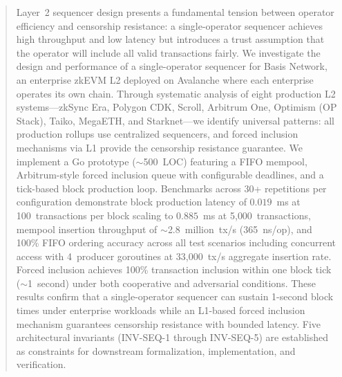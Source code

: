 
\begin{abstract}
Layer~2 sequencer design presents a fundamental tension between operator efficiency and
censorship resistance: a single-operator sequencer achieves high throughput and low latency
but introduces a trust assumption that the operator will include all valid transactions
fairly. We investigate the design and performance of a single-operator sequencer for Basis
Network, an enterprise zkEVM L2 deployed on Avalanche where each enterprise operates its
own chain. Through systematic analysis of eight production L2 systems---zkSync Era,
Polygon CDK, Scroll, Arbitrum One, Optimism (OP Stack), Taiko, MegaETH, and
Starknet---we identify universal patterns: all production rollups use centralized sequencers,
and forced inclusion mechanisms via L1 provide the censorship resistance guarantee.
We implement a Go prototype (${\sim}$500~LOC) featuring a FIFO mempool, Arbitrum-style
forced inclusion queue with configurable deadlines, and a tick-based block production
loop. Benchmarks across 30+ repetitions per configuration demonstrate block production
latency of $0.019$~ms at 100~transactions per block scaling to $0.885$~ms at
5{,}000~transactions, mempool insertion throughput of ${\sim}$2.8~million~tx/s
(365~ns/op), and 100\% FIFO ordering accuracy across all test scenarios including
concurrent access with 4~producer goroutines at 33{,}000~tx/s aggregate insertion rate.
Forced inclusion achieves 100\% transaction inclusion within one block tick
(${\sim}$1~second) under both cooperative and adversarial conditions. These results
confirm that a single-operator sequencer can sustain 1-second block times under enterprise
workloads while an L1-based forced inclusion mechanism guarantees censorship resistance
with bounded latency. Five architectural invariants (INV-SEQ-1 through INV-SEQ-5) are
established as constraints for downstream formalization, implementation, and verification.
\end{abstract}
